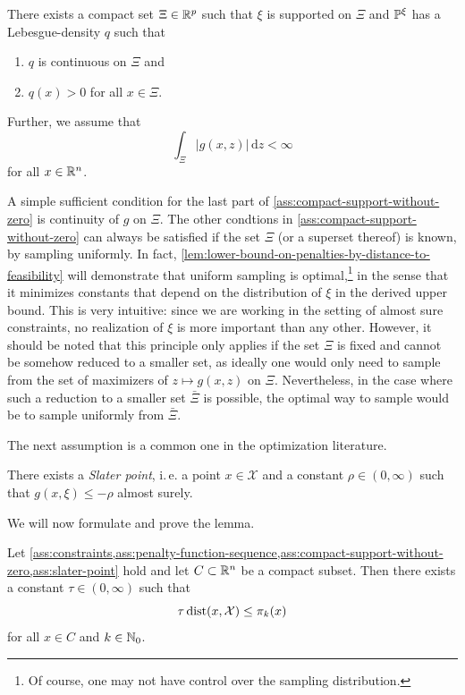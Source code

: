 \begin{assumption}
    \label{ass:compact-support-without-zero}
    There exists a compact set $\Xi\in\mathbb{R}^p$ such that $\xi$ is supported
    on $\Xi$ and $\mathbb{P}^\xi$ has a Lebesgue-density $q$ such that
    \begin{enumerate}
        \item $q$ is continuous on $\Xi$ and
        \item $q(x) > 0$ for all $x\in \Xi$.
    \end{enumerate}
    Further, we assume that
    \[
        \int_{\Xi} |g(x,z)| \, \text{d}z < \infty
    \]
    for all $x\in\mathbb{R}^n$.
\end{assumption}
A simple sufficient condition for the last part of \cref{ass:compact-support-without-zero} is continuity of $g$
on $\Xi$. The other condtions in \cref{ass:compact-support-without-zero} can always be satisfied
if the set $\Xi$ (or a superset thereof) is known, by sampling uniformly.
In fact, \cref{lem:lower-bound-on-penalties-by-distance-to-feasibility} will
demonstrate that uniform sampling is optimal,\footnote{Of course, one may not
have control over the sampling distribution.} in the sense that
it minimizes constants that depend on the distribution of $\xi$ in the derived upper bound.
This is very intuitive: since we are working in the setting of almost sure constraints,
no realization of $\xi$ is more important than any other.
However, it should be noted that this principle only applies if the set $\Xi$
is fixed and cannot be somehow reduced to a smaller set, as ideally one
would only need to sample from the set of maximizers of $z\mapsto g(x, z)$ on $\Xi$.
Nevertheless, in the case where such a reduction to a smaller set $\bar{\Xi}$ is possible, the optimal way
to sample would be to sample uniformly from $\bar{\Xi}$.

The next assumption is a common one in the optimization literature.
\begin{assumption}
    \label{ass:slater-point}
    There exists a \textit{Slater point}, i.\,e. a point $x\in\mathcal{X}$ and a constant
    $\rho\in(0,\infty)$ such that
    $g(x, \xi) \leq -\rho$
    almost surely.
\end{assumption}
We will now formulate and prove the lemma.
\begin{lemma}
    \label{lem:lower-bound-on-penalties-by-distance-to-feasibility}
    Let \cref{ass:constraints,ass:penalty-function-sequence,ass:compact-support-without-zero,ass:slater-point} hold
    and let $C\subset\mathbb{R}^n$ be a compact subset. Then
    there exists a constant $\tau\in(0,\infty)$ such that
    \begin{equation}
        \label{eq:lem:lower-bound-on-penalties-by-distance-to-feasibility:tau}
        \tau \operatorname{dist}(x, \mathcal{X}) \leq \pi_k(x)
    \end{equation}
    for all $x\in C$ and $k\in\mathbb{N}_0$.
\end{lemma}

